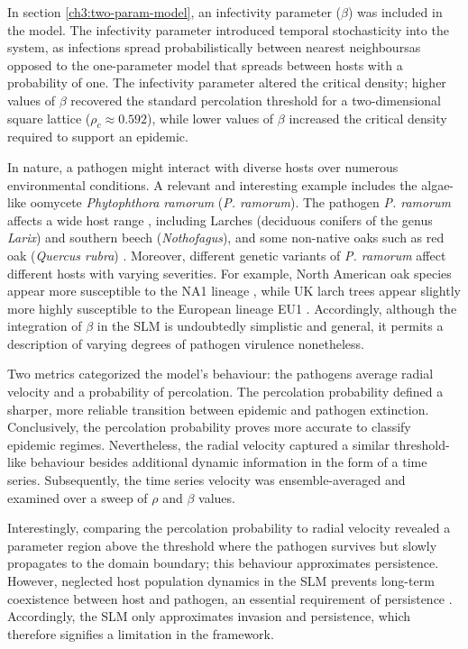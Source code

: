 In section \ref{ch3:two-param-model}, an infectivity parameter ($\beta$) was included in the model.
The infectivity parameter introduced temporal stochasticity into the system, as infections spread probabilistically between nearest neighbours\textemdash as opposed to the one-parameter model that spreads between hosts with a probability of one.
The infectivity parameter altered the critical density; 
higher values of $\beta$ recovered the standard percolation threshold for a two-dimensional square lattice ($\rho_c\approx 0.592$), 
while lower values of $\beta$ increased the critical density required to support an epidemic.

In nature, a pathogen might interact with diverse hosts over numerous environmental conditions.
A relevant and interesting example includes the algae-like oomycete \textit{Phytophthora ramorum} (\textit{P. ramorum}). 
The pathogen \textit{P. ramorum} affects a wide host range \cite{GRUNWALD2012131}, 
including Larches (deciduous conifers of the genus \textit{Larix}) and southern beech (\textit{Nothofagus}), 
and some non-native oaks such as red oak (\textit{Quercus rubra}) \cite{grunwald2008phytophthora}.
Moreover, different genetic variants of \textit{P. ramorum} affect different hosts with varying severities.
For example, North American oak species appear more susceptible to the NA1 lineage \cite{rizzo2002phytophthora},  while UK larch trees appear slightly more highly susceptible to the European lineage EU1 \cite{king2015planta}. Accordingly, although the integration of $\beta$ in the SLM is undoubtedly simplistic and general, it permits a description of varying degrees of pathogen virulence nonetheless.

Two metrics categorized the model's behaviour: the pathogens average radial velocity and a probability of percolation.
The percolation probability defined a sharper, more reliable transition between epidemic and pathogen extinction.
Conclusively, the percolation probability proves more accurate to classify epidemic regimes.
Nevertheless, the radial velocity captured a similar threshold-like behaviour besides additional dynamic information in the form of a time series.
Subsequently, the time series velocity was ensemble-averaged and examined over a sweep of $\rho$ and $\beta$ values. 

Interestingly, comparing the percolation probability to radial velocity revealed a parameter region above the threshold where the pathogen survives but slowly propagates to the domain boundary; this behaviour approximates persistence.
However, neglected host population dynamics in the SLM prevents long-term coexistence between host and pathogen, 
an essential requirement of persistence \cite{gilligan2008epidemiological}. 
Accordingly, the SLM only approximates invasion and persistence, which therefore signifies a limitation in the framework. 

